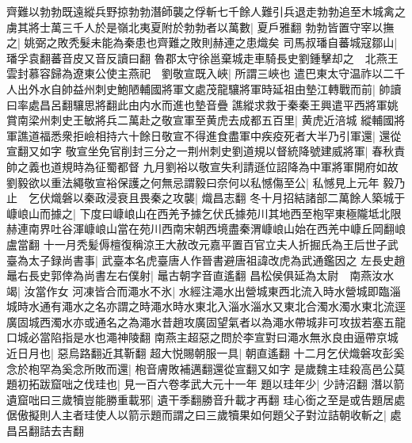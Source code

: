 齊難以勃勃既遠縱兵野掠勃勃潛師襲之俘斬七千餘人難引兵退走勃勃追至木城禽之虜其將士萬三千人於是嶺北夷夏附於勃勃者以萬數|{
	夏戶雅翻}
勃勃皆置守宰以撫之|{
	姚弼之敗秃髮未能為秦患也齊難之敗則赫連之患熾矣}
司馬叔璠自蕃城寇鄒山|{
	璠孚袁翻蕃音皮又音反讀曰翻}
魯郡太守徐邕棄城走車騎長史劉鍾擊却之　北燕王雲封慕容歸為遼東公使主燕祀　劉敬宣既入峽|{
	所謂三峽也}
遣巴東太守温祚以二千人出外水自帥益州刺史鮑陋輔國將軍文處茂龍驤將軍時延祖由墊江轉戰而前|{
	帥讀曰率處昌呂翻驤思將翻此由内水而進也墊音疊}
譙縱求救于秦秦王興遣平西將軍姚賞南梁州刺史王敏將兵二萬赴之敬宣軍至黄虎去成都五百里|{
	黄虎近涪城}
縱輔國將軍譙道福悉衆拒嶮相持六十餘日敬宣不得進食盡軍中疾疫死者大半乃引軍還|{
	還從宣翻又如字}
敬宣坐免官削封三分之一荆州刺史劉道規以督統降號建威將軍|{
	春秋責帥之義也道規時為征蜀都督}
九月劉裕以敬宣失利請遜位詔降為中軍將軍開府如故劉毅欲以重法繩敬宣裕保護之何無忌謂毅曰奈何以私憾傷至公|{
	私憾見上元年}
毅乃止　乞伏熾磐以秦政浸衰且畏秦之攻襲|{
	熾昌志翻}
冬十月招結諸部二萬餘人築城于嵻㟍山而據之|{
	下度曰嵻㟍山在西羌予據乞伏氏據苑川其地西至枹罕東極隴坻北限赫連南界吐谷渾嵻㟍山當在苑川西南宋朝西境盡秦渭嵻㟍山始在西羌中嵻丘岡翻㟍盧當翻}
十一月秃髪傉檀復稱涼王大赦改元嘉平置百官立夫人折掘氏為王后世子武臺為太子録尚書事|{
	武臺本名虎臺唐人作晉書避唐祖諱改虎為武通鑑因之}
左長史趙鼂右長史郭倖為尚書左右僕射|{
	鼂古朝字音直遙翻}
昌松侯俱延為太尉　南燕汝水竭|{
	汝當作女}
河凍皆合而澠水不氷|{
	水經注澠水出營城東西北流入時水營城即臨淄城時水通有澠水之名亦謂之時澠水時水東北入淄水淄水又東北合濁水濁水東北流逕廣固城西濁水亦或通名之為澠水昔趙攻廣固望氣者以為澠水帶城非可攻拔若塞五龍口城必當陷指是水也澠神陵翻}
南燕主超惡之問於李宣對曰澠水無氷良由逼帶京城近日月也|{
	惡烏路翻近其靳翻}
超大悦賜朝服一具|{
	朝直遙翻}
十二月乞伏熾磐攻彭奚念於枹罕為奚念所敗而還|{
	枹音膚敗補邁翻還從宣翻又如字}
是歲魏主珪殺高邑公莫題初拓跋窟咄之伐珪也|{
	見一百六卷孝武大元十一年}
題以珪年少|{
	少詩沼翻}
潛以箭遺窟咄曰三歲犢豈能勝重載邪|{
	遺干季翻勝音升載才再翻}
珪心銜之至是或告題居處倨傲擬則人主者珪使人以箭示題而謂之曰三歲犢果如何題父子對泣詰朝收斬之|{
	處昌呂翻詰去吉翻}


